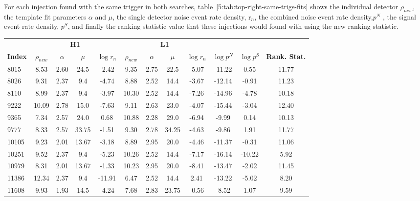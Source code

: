 For each injection found with the same trigger in both searches, table~\ref{5:tab:top-right-same-trigs-fits} shows the individual detector $\rho_{new}$, the template fit parameters $\alpha$ and $\mu$, the single detector noise event rate density, r$_n$, the combined noise event rate density,$p^{N}$ , the signal event rate density, $p^{S}$, and finally the ranking statistic value that these injections would found with using the new ranking statistic.
%
\begin{table}[ht]
    \centering
    \small
    \setlength{\tabcolsep}{4pt}
    \begin{tabular}{lccccccccccc}
        \toprule
        & \multicolumn{4}{c}{\textbf{H1}} & \multicolumn{4}{c}{\textbf{L1}} \\
        \cmidrule(lr){2-5} \cmidrule(lr){6-9}
        \textbf{Index} & \textbf{$\rho_{new}$} & \textbf{$\alpha$} & \textbf{$\mu$} & \textbf{$\log r_n$} & \textbf{$\rho_{new}$} & \textbf{$\alpha$} & \textbf{$\mu$} & \textbf{$\log r_n$} & \textbf{$\log p^{N}$} & \textbf{$\log p^{S}$} & \textbf{Rank. Stat.} \\
        \midrule
        8015 & 8.53 & 2.60 & 24.5 & -2.42 & 9.35 & 2.75 & 22.5 & -5.07 & -11.22 & 0.55 & 11.77 \\
        8026 & 9.31 & 2.37 & 9.4 & -4.74 & 8.88 & 2.52 & 14.4 & -3.67 & -12.14 & -0.91 & 11.23 \\
        8110 & 8.99 & 2.37 & 9.4 & -3.97 & 10.30 & 2.52 & 14.4 & -7.26 & -14.96 & -4.78 & 10.18 \\
        9222 & 10.09 & 2.78 & 15.0 & -7.63 & 9.11 & 2.63 & 23.0 & -4.07 & -15.44 & -3.04 & 12.40 \\
        9365 & 7.34 & 2.57 & 24.0 & 0.68 & 10.88 & 2.28 & 29.0 & -6.94 & -9.99 & 0.14 & 10.13 \\
        9777 & 8.33 & 2.57 & 33.75 & -1.51 & 9.30 & 2.78 & 34.25 & -4.63 & -9.86 & 1.91 & 11.77 \\
        10105 & 9.23 & 2.01 & 13.67 & -3.18 & 8.89 & 2.95 & 20.0 & -4.46 & -11.37 & -0.31 & 11.06 \\
        10251 & 9.52 & 2.37 & 9.4 & -5.23 & 10.26 & 2.52 & 14.4 & -7.17 & -16.14 & -10.22 & 5.92 \\
        10979 & 8.31 & 2.01 & 13.67 & -1.33 & 10.23 & 2.95 & 20.0 & -8.41 & -13.47 & -2.02 & 11.45 \\
        11386 & 12.34 & 2.37 & 9.4 & -11.91 & 6.47 & 2.52 & 14.4 & 2.41 & -13.22 & -5.02 & 8.20 \\
        11608 & 9.93 & 1.93 & 14.5 & -4.24 & 7.68 & 2.83 & 23.75 & -0.56 & -8.52 & 1.07 & 9.59 \\

\end{tabular}
\end{table}
